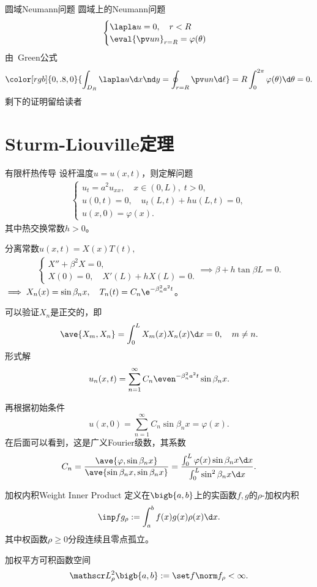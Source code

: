 \begin{example}{圆域Neumann问题}{}
	圆域上的Neumann问题
	\begin{align*}
		\begin{cases}
			\lapla u=0,\quad r<R\\
			\eval{\pv un}_{r=R}=\varphi(\theta)
		\end{cases}
	\end{align*}
	由~\textcolor[rgb]{0,.8,0}{Green公式}
	\begin{align*}
		{\color[rgb]{0,.8,0}{\int_{D_R}\lapla u\d x\nd y=\oint_{r=R}\pv un\d\ell}}=R\int_0^{2\pi}\varphi(\theta)\d\theta=0.
	\end{align*}
	剩下的证明留给读者
\end{example}

\section{Sturm-Liouville定理}
\begin{example}{有限杆热传导}{}
	设杆温度$u=u(x,t)$，则定解问题
	\begin{align*}
		\begin{cases}
			u_t=a^2u_{xx},\quad x\in(0,L),\;t>0,\\
			u(0,t)=0,\quad u_t(L,t)+hu(L,t)=0,\\
			u(x,0)=\varphi(x).
		\end{cases}
	\end{align*}
	其中热交换常数$h>0$。
	
	分离常数$u(x,t)=X(x)T(t),$
	\begin{align*}
		\begin{cases}
			X''+\beta^2X=0, \\
			X(0)=0,\quad X'(L)+hX(L)=0.
		\end{cases}\implies\beta+h\tan\beta L=0.
	\end{align*}
	$\implies X_n(x)=\sin\beta_nx,\quad T_n(t)=C_n\e^{-\beta_n^2a^2t}$。
	
	可以验证$X_n$是正交的，即
	\[
		\ave{X_m,X_n}=\int_0^LX_m(x)X_n(x)\d x=0,\quad m\neq n.
	\]
	形式解
	\[
		u_n(x,t)=\sum_{n=1}^\infty C_n\even^{-\beta_n^2a^2t}\sin\beta_nx.
	\]
	
	再根据初始条件
	\[
		u(x,0)=\sum_{n=1}^\infty C_n\sin\beta_nx=\varphi(x).
	\]
	在后面可以看到，这是广义Fourier级数，其系数
	\[
		C_n=\frac{\ave{\varphi,\sin\beta_nx}}{\ave{\sin\beta_nx,\sin\beta_nx}}=\frac{\int_0^L\varphi(x)\sin\beta_nx\d x}{\int_0^L\sin^2\beta_nx\d x}.
	\]
\end{example}
\begin{definition}{加权内积}{Weight Inner Product}
	定义在$\bigb{a,b}$上的实函数$f,g$的$\rho$\;-\;加权内积
	\[
		\inp fg_\rho:=\int_a^bf(x)g(x)\rho(x)\d x.
	\]
	其中权函数$\rho\geqslant 0$分段连续且零点孤立。

	加权平方可积函数空间
	\[
		\mathscr L_\rho^2\bigb{a,b}:=\set f{\norm f_\rho<\infty}.
	\]
\end{definition}
